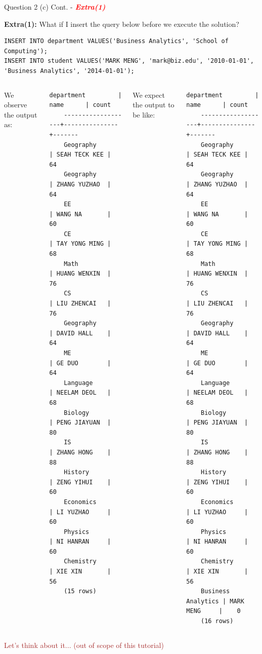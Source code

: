 \begin{frame}[fragile]{Question 2 (c) Cont. - \textcolor{red}{\textit{\textbf{Extra(1)}}}}
	
\textbf{Extra(1):} What if I insert the query below before we execute the solution?
\begin{lstlisting}[style=sql-small]
INSERT INTO department VALUES('Business Analytics', 'School of Computing');
INSERT INTO student VALUES('MARK MENG', 'mark@biz.edu', '2010-01-01', 'Business Analytics', '2014-01-01');
\end{lstlisting}

\begin{columns}[t]
We observe the output as:\\
\begin{lstlisting}[style=terminal-tiny]	
	department         |     name      | count
	-------------------+---------------+-------
	Geography          | SEAH TECK KEE |    64
	Geography          | ZHANG YUZHAO  |    64
	EE                 | WANG NA       |    60
	CE                 | TAY YONG MING |    68
	Math               | HUANG WENXIN  |    76
	CS                 | LIU ZHENCAI   |    76
	Geography          | DAVID HALL    |    64
	ME                 | GE DUO        |    64
	Language           | NEELAM DEOL   |    68
	Biology            | PENG JIAYUAN  |    80
	IS                 | ZHANG HONG    |    88
	History            | ZENG YIHUI    |    60
	Economics          | LI YUZHAO     |    60
	Physics            | NI HANRAN     |    60
	Chemistry          | XIE XIN       |    56
	(15 rows)
\end{lstlisting}

We expect the output to be like:\\
\begin{lstlisting}[style=terminal-tiny]	
	department         |     name      | count
	-------------------+---------------+-------
	Geography          | SEAH TECK KEE |    64
	Geography          | ZHANG YUZHAO  |    64
	EE                 | WANG NA       |    60
	CE                 | TAY YONG MING |    68
	Math               | HUANG WENXIN  |    76
	CS                 | LIU ZHENCAI   |    76
	Geography          | DAVID HALL    |    64
	ME                 | GE DUO        |    64
	Language           | NEELAM DEOL   |    68
	Biology            | PENG JIAYUAN  |    80
	IS                 | ZHANG HONG    |    88
	History            | ZENG YIHUI    |    60
	Economics          | LI YUZHAO     |    60
	Physics            | NI HANRAN     |    60
	Chemistry          | XIE XIN       |    56
	Business Analytics | MARK MENG     |    0
	(16 rows)
\end{lstlisting}

\end{columns}

\textcolor{brown}{Let's think about it... (out of scope of this tutorial)}
\end{frame}

